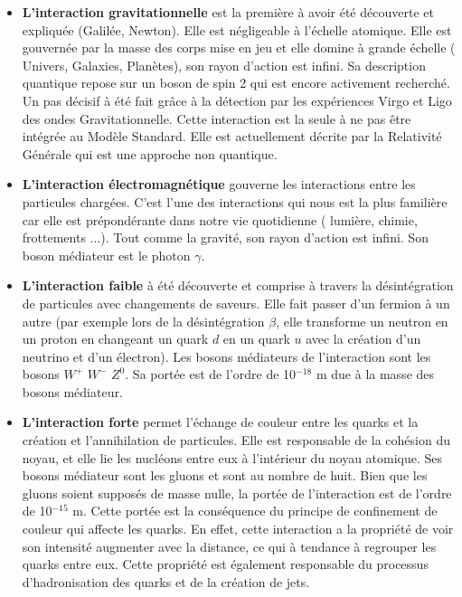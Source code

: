 \begin{itemize}[label=$\bullet$]
\item \textbf{L'interaction gravitationnelle} est la première à avoir été découverte et expliquée (Galilée, Newton). Elle est négligeable à l'échelle atomique. Elle est gouvernée par la masse des corps mise en jeu et elle domine à grande échelle ( Univers, Galaxies, Planètes), son rayon d'action est infini. Sa description quantique repose sur un boson de spin 2 qui est encore activement recherché. Un pas décisif à été fait grâce à la détection par les expériences Virgo et Ligo des ondes Gravitationnelle. Cette interaction est la seule à ne pas être intégrée au Modèle Standard. Elle est actuellement décrite par la Relativité Générale qui est une approche non quantique.

\item \textbf{L'interaction électromagnétique} gouverne les interactions entre les particules chargées. C'est l'une des interactions qui nous est la plus familière car elle est prépondérante dans notre vie quotidienne ( lumière, chimie, frottements ...). Tout comme la gravité, son rayon d'action est infini. Son boson médiateur est le photon $\gamma$.

\item \textbf{L'interaction faible} à été découverte et comprise à travers la désintégration de particules avec changements de saveurs. Elle fait passer d'un fermion à un autre (par exemple lors de la désintégration $\beta$, elle transforme un neutron en un proton en changeant un quark $d$ en un quark $u$ avec la création d'un neutrino et d'un électron). Les bosons médiateurs de l'interaction sont les bosons $W^{+}$ $W^{-}$ $Z^{0}$. Sa portée est de l'ordre de 10$^{-18}$ m due à la masse des bosons médiateur.

\item \textbf{L'interaction forte} permet l'échange de couleur entre les quarks et la création et l'annihilation de particules. Elle est responsable de la cohésion du noyau, et elle lie les nucléons entre eux à l'intérieur du noyau atomique. Ses bosons médiateur sont les gluons et sont au nombre de huit. Bien que les gluons soient supposés de masse nulle, la portée de l'interaction est de l'ordre de 10$^{-15}$ m. Cette portée est la conséquence du principe de confinement de couleur qui affecte les quarks. En effet, cette interaction a la propriété de voir son intensité augmenter avec la distance, ce qui à tendance à regrouper les quarks entre eux. Cette propriété est également responsable du processus d'hadronisation des quarks et de la création de jets.
\end{itemize}
